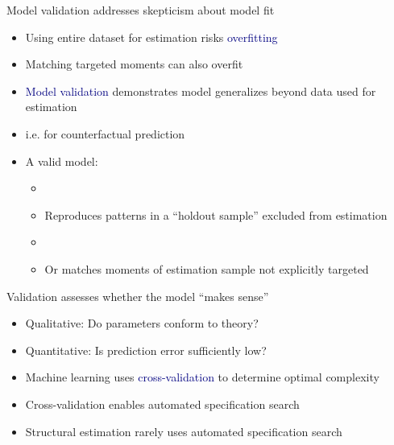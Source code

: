 \documentclass[aspectratio=169]{beamer}
\begin{document}
\begin{frame}

Model validation addresses skepticism about model fit

\bigskip{}

\begin{itemize}
\itemsep1.5em
\item<2-> Using entire dataset for estimation risks \textcolor{navy}{overfitting}
\item<3-> Matching targeted moments can also overfit
\item<4-> \textcolor{navy}{Model validation} demonstrates model generalizes beyond data used for estimation
\item<5-> i.e. for counterfactual prediction
\item<6-> A valid model:
\begin{itemize}
    \item<7->[]
    \item<7-> Reproduces patterns in a ``holdout sample'' excluded from estimation
    \item<7->[]
    \item<8-> Or matches moments of estimation sample not explicitly targeted
\end{itemize}

\end{itemize}

\end{frame}

\begin{frame}

Validation assesses whether the model ``makes sense''

\bigskip{}

\begin{itemize}
\itemsep1.5em
\item<2-> Qualitative: Do parameters conform to theory?
\item<3-> Quantitative: Is prediction error sufficiently low?
\item<4-> Machine learning uses \textcolor{navy}{cross-validation} to determine optimal complexity
\item<5-> Cross-validation enables automated specification search
\item<6-> Structural estimation rarely uses automated specification search
\end{itemize}

\end{frame}
\end{document}
